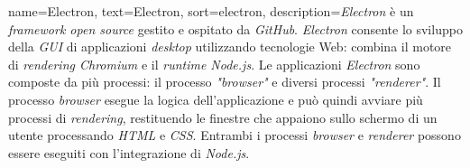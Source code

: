  {
    name=Electron,
    text=Electron,
    sort=electron,
    description={\emph{Electron} è un \emph{framework open source} gestito e ospitato da \emph{GitHub}. \emph{Electron} consente lo sviluppo della \emph{GUI} di applicazioni \emph{desktop} utilizzando tecnologie Web: combina il motore di \emph{rendering Chromium} e il \emph{runtime Node.js}. Le applicazioni \emph{Electron} sono composte da più processi: il processo \emph{"browser"} e diversi processi \emph{"renderer"}. Il processo \emph{browser} esegue la logica dell'applicazione e può quindi avviare più processi di \emph{rendering}, restituendo le finestre che appaiono sullo schermo di un utente processando \emph{HTML} e \emph{CSS}. Entrambi i processi \emph{browser} e \emph{renderer} possono essere eseguiti con l'integrazione di \emph{Node.js}.}
}
